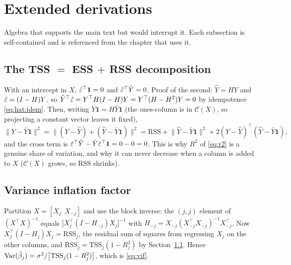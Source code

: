 \section{Extended derivations}
\label{ch:derivations}

Algebra that supports the main text but would interrupt it. Each subsection is
self-contained and is referenced from the chapter that uses it.

\subsection{The TSS $=$ ESS $+$ RSS decomposition}
\label{sec:der:anova}

With an intercept in $X$, $\hat{\varepsilon}^{\top}\mathbf 1=0$ and $\hat{\varepsilon}^{\top}\hat Y=0$.
Proof of the second: $\hat Y=HY$ and $\hat{\varepsilon}=(I-H)Y$, so
$\hat Y^{\top}\hat{\varepsilon} = Y^{\top}H(I-H)Y = Y^{\top}(H-H^2)Y = 0$ by idempotence
\eqref{eq:hat:idem}. Then, writing $\bar Y\mathbf 1 = H\bar Y\mathbf 1$ (the ones-column is
in $\mathcal C(X)$, so projecting a constant vector leaves it fixed),
\[
  \lVert Y-\bar Y\mathbf 1\rVert^2
  = \lVert (Y-\hat Y) + (\hat Y-\bar Y\mathbf 1)\rVert^2
  = \mathrm{RSS} + \lVert\hat Y-\bar Y\mathbf 1\rVert^2 + 2(Y-\hat Y)^{\top}(\hat Y-\bar Y\mathbf1),
\]
and the cross term is $\hat{\varepsilon}^{\top}\hat Y - \bar Y\hat{\varepsilon}^{\top}\mathbf 1 = 0-0=0$.
This is why $R^2$ of \eqref{eq:r2} is a genuine share of variation, and why it can never
decrease when a column is added to $X$ ($\mathcal C(X)$ grows, so $\mathrm{RSS}$ shrinks).

\subsection{Variance inflation factor}
\label{sec:der:vif}

Partition $X=[X_j\ \ X_{-j}]$ and use the block inverse: the $(j,j)$ element of
$(X^{\top}X)^{-1}$ equals $\bigl[X_j^{\top}(I-H_{-j})X_j\bigr]^{-1}$ with
$H_{-j}=X_{-j}(X_{-j}^{\top}X_{-j})^{-1}X_{-j}^{\top}$. Now
$X_j^{\top}(I-H_j)X_j = \mathrm{RSS}_j$, the residual sum of squares from regressing $X_j$
on the other columns, and $\mathrm{RSS}_j=\mathrm{TSS}_j(1-R_j^2)$ by
Section~\ref{sec:der:anova}. Hence
$\operatorname{Var}(\hat\beta_j)=\sigma^2/\bigl[\mathrm{TSS}_j(1-R_j^2)\bigr]$, which is \eqref{eq:vif}.

